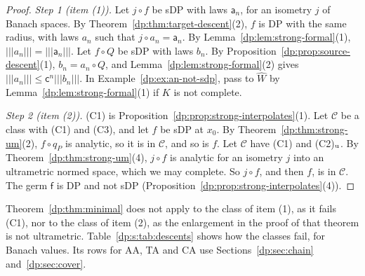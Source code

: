 \documentclass[11pt]{amsart}
\theoremstyle{definition}
\theoremstyle{remark}
\numberwithin{equation}{section}
\newcommand{\cC}{\mathcal{C}}
\theoremstyle{plain}
\theoremstyle{definition}
\theoremstyle{plain}
\begin{document}
\begin{proof}
\emph{Step 1 (item (1)).} Let $j\circ f$ be sDP with laws $\mathsf a_n$, for an isometry $j$ of Banach spaces. By Theorem~\ref{dp:thm:target-descent}(2), $f$ is DP with the same radius, with laws $a_n$ such that $j\circ a_n=\mathsf a_n$. By Lemma~\ref{dp:lem:strong-formal}(1), $\lvert\!\lvert\!\lvert a_n\rvert\!\rvert\!\rvert=\lvert\!\lvert\!\lvert \mathsf a_n\rvert\!\rvert\!\rvert$. Let $f\circ Q$ be sDP with laws $b_n$. By Proposition~\ref{dp:prop:source-descent}(1), $b_n=a_n\circ Q$, and Lemma~\ref{dp:lem:strong-formal}(2) gives $\lvert\!\lvert\!\lvert a_n\rvert\!\rvert\!\rvert\le\mathsf c^n\lvert\!\lvert\!\lvert b_n\rvert\!\rvert\!\rvert$. In Example~\ref{dp:ex:an-not-sdp}, pass to $\widehat W$ by Lemma~\ref{dp:lem:strong-formal}(1) if $K$ is not complete.

\emph{Step 2 (item (2)).} \textup{(C1)} is Proposition~\ref{dp:prop:strong-interpolates}(1). Let $\cC$ be a class with \textup{(C1)} and \textup{(C3)}, and let $f$ be sDP at $x_0$. By Theorem~\ref{dp:thm:strong-um}(2), $f\circ q_P$ is analytic, so it is in $\cC$, and so is $f$. Let $\cC$ have \textup{(C1)} and \textup{(C2)}$_{\rm u}$. By Theorem~\ref{dp:thm:strong-um}(4), $j\circ f$ is analytic for an isometry $j$ into an ultrametric normed space, which we may complete. So $j\circ f$, and then $f$, is in $\cC$. The germ $\mathsf f$ is DP and not sDP (Proposition~\ref{dp:prop:strong-interpolates}(4)).
\end{proof}

Theorem~\ref{dp:thm:minimal} does not apply to the class of item (1), as it fails (C1), nor to the class of item (2), as the enlargement in the proof of that theorem is not ultrametric. Table~\ref{dp:s:tab:descents} shows how the classes fail, for Banach values. Its rows for AA, TA and CA use Sections~\ref{dp:sec:chain} and~\ref{dp:sec:cover}.
\end{document}
